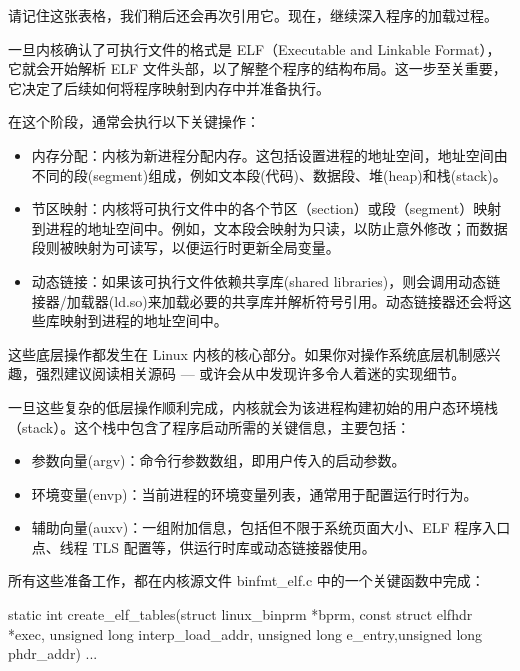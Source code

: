 请记住这张表格，我们稍后还会再次引用它。现在，继续深入程序的加载过程。

一旦内核确认了可执行文件的格式是 ELF（Executable and Linkable Format），它就会开始解析 ELF 文件头部，以了解整个程序的结构布局。这一步至关重要，它决定了后续如何将程序映射到内存中并准备执行。

在这个阶段，通常会执行以下关键操作：

\begin{itemize}
\item 
内存分配：内核为新进程分配内存。这包括设置进程的地址空间，地址空间由不同的段(segment)组成，例如文本段(代码)、数据段、堆(heap)和栈(stack)。

\item 
节区映射：内核将可执行文件中的各个节区（section）或段（segment）映射到进程的地址空间中。例如，文本段会映射为只读，以防止意外修改；而数据段则被映射为可读写，以便运行时更新全局变量。

\item 
动态链接：如果该可执行文件依赖共享库(shared libraries)，则会调用动态链接器/加载器(ld.so)来加载必要的共享库并解析符号引用。动态链接器还会将这些库映射到进程的地址空间中。
\end{itemize}

这些底层操作都发生在 Linux 内核的核心部分。如果你对操作系统底层机制感兴趣，强烈建议阅读相关源码 --- 或许会从中发现许多令人着迷的实现细节。

一旦这些复杂的低层操作顺利完成，内核就会为该进程构建初始的用户态环境栈（stack）。这个栈中包含了程序启动所需的关键信息，主要包括：

\begin{itemize}
\item 
参数向量(argv)：命令行参数数组，即用户传入的启动参数。

\item 
环境变量(envp)：当前进程的环境变量列表，通常用于配置运行时行为。

\item 
辅助向量(auxv)：一组附加信息，包括但不限于系统页面大小、ELF 程序入口点、线程 TLS 配置等，供运行时库或动态链接器使用。
\end{itemize}

所有这些准备工作，都在内核源文件 binfmt\_elf.c 中的一个关键函数中完成：

\begin{cpp}
static int create_elf_tables(struct linux_binprm *bprm,
const struct elfhdr *exec, unsigned long interp_load_addr,
unsigned long e_entry,unsigned long phdr_addr) { ... }
\end{cpp}

